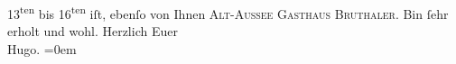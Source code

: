 \begin{ledgroupsized}[t]{13cm}
                     13\textsuperscript{ten} bis 16\textsuperscript{ten} iſt, ebenſo von Ihnen\pend
           \pstart
           \textsc{Alt-Aussee Gasthaus Bru{\geminationn}thaler}.\pend
           \pstart
           Bin ſehr erholt und wohl.\pend
           \pstart
           Herzlich Euer{\\[\baselineskip]}\spacefill\mbox{Hugo.}\pend
           \leftskip=0em{}          \endnumbering{}\end{ledgroupsized}  \newcommand{\dateiname}{L00957}\newcommand{\titel}{Hugo von Hofmannsthal an Arthur Schnitzler, 6. 8. 1899}\newcommand{\editorInnen}{Martin Anton Müller und Gerd-Hermann Susen}
      